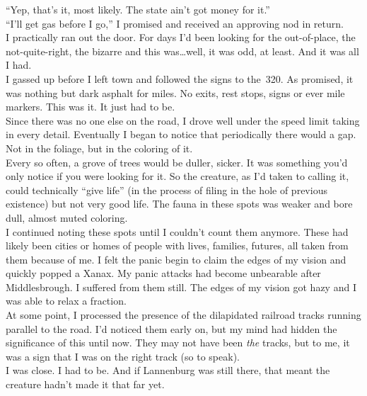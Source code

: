 \documentclass[a5paper]{scrartcl}
\begin{document}
\enquote{Yep, that's it, most likely. The state ain't got money for it.}\\


\enquote{I'll get gas before I go,} I promised and received an approving nod in return.\\


I practically ran out the door. For days I'd been looking for the out-of-place, the not-quite-right, the bizarre and this was\dots well, it was odd, at least. And it was all I had.\\


I gassed up before I left town and followed the signs to the~320. As promised, it was nothing but dark asphalt for miles. No exits, rest stops, signs or ever mile markers. This was it. It just had to be.\\


Since there was no one else on the road, I drove well under the speed limit taking in every detail. Eventually I began to notice that periodically there would a gap. Not in the foliage, but in the coloring of it. \\


Every so often, a grove of trees would be duller, sicker. It was something you'd only notice if you were looking for it. So the creature, as I'd taken to calling it, could technically \enquote{give life} (in the process of filing in the hole of previous existence) but not very good life.  The fauna in these spots was  weaker and bore dull, almost muted coloring.\\


I continued noting these spots until I couldn't count them anymore. These had likely been cities or homes of people with lives, families, futures, all taken from them because of me. I felt the panic begin to claim the edges of my vision and quickly popped a Xanax. My panic attacks had become unbearable after Middlesbrough. I suffered from them still. The edges of my vision got hazy and I was able to relax a fraction.\\


At some point, I processed the presence of the dilapidated railroad tracks running parallel to the road. I'd noticed them early on, but my mind had hidden the significance of this until now. They may not have been \textit{the}
 tracks, but to me, it was a sign that I was on the right track (so to speak).\\


I was close. I had to be. And if Lannenburg was still there, that meant the creature hadn't made it that far yet.\\
\end{document}
